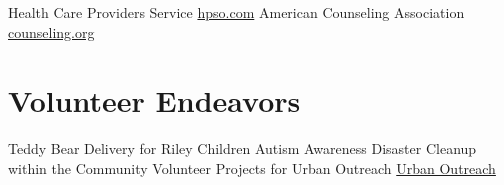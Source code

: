 \documentclass[]{friggeri-cv}
\begin{document}
\begin{entrylist}
  \entry
    {}
    {Health Care Providers Service}
    {\href{https://landing.hpso.com/hpso-ancillary-landing/?refID=WW2GWi&utm_source=google&utm_medium=cpc&utm_campaign=HC-HPSO-PPC-Brand-Exact&utm_term=healthcare+providers+service+organization&gclid=CjwKCAiA-P7xBRAvEiwAow-VaSPwfzZA1U_iHGCd68hJEDTZO7znWkmR_576lgcbNQ6AXX_Fq1lbihoCMaEQAvD_BwE&gclsrc=aw.ds}{hpso.com}}
    {}
  \entry
    {}
    {American Counseling Association}
    {\href{https://www.counseling.org/}{counseling.org}}
    {}
\end{entrylist}

\section{Volunteer Endeavors}

\begin{entrylist}
	\entry
	{}
	{Teddy Bear Delivery for Riley Children}
	{\href{}{}}
	{}
	\entry
	{}
	{Autism Awareness}
	{\href{}{}}
	{}
	\entry
	{}
	{Disaster Cleanup within the Community}
	{\href{}{}}
	{}
	\entry
	{}
	{Volunteer Projects for Urban Outreach}
	{\href{https://www.kokomourbanoutreach.org/}{Urban Outreach}}
	{}
\end{entrylist}
\phantom{Work with ASC legal, social work, housing, and health staff to counsel and support clients in distress regarding stigma, new diagnoses, disclosure, IPV, and other issues and make appropriate referrals to external providers
	Prepare affidavits for asylum and VAWA cases
	10-12 hours per week of counseling and support group facilitation time}
\end{document}
